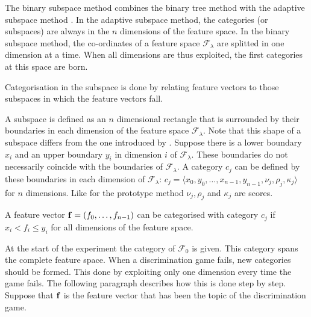 The binary subspace method combines the binary tree method with the adaptive subspace method \citep{dejongvogt:1998,dejong:2000}. In the adaptive subspace method, the categories (or subspaces) are always in the $n$ dimensions of the feature space. In the binary subspace method, the co-ordinates of a feature space ${\mathcal F}_\lambda$ are splitted in one dimension at a time. When all dimensions are thus exploited, the first categories at this space are born.

Categorisation in the subspace is done by relating feature vectors to those subspaces in which the feature vectors fall.


A subspace is defined as an $n$ dimensional rectangle that is surrounded by their boundaries in each dimension of the feature space ${\mathcal F}_\lambda$. Note that this shape of a subspace differs from the one introduced by \citet{oja:83}. Suppose there is a lower boundary $x_i$ and an upper boundary $y_i$ in dimension $i$ of ${\mathcal F}_\lambda$. These boundaries do not necessarily coincide with the boundaries of ${\mathcal F}_\lambda$. A category $c_j$ can be defined by these boundaries in each dimension of ${\mathcal F}_\lambda$: $c_j=\langle x_0,y_0,\ldots,x_{n-1},y_{n-1},\nu_j,\rho_j,\kappa_j \rangle$ for $n$ dimensions. Like for the prototype method $\nu_j,\rho_j$ and $\kappa_j$ are scores.

A feature vector ${\bf f}=(f_0,\ldots,f_{n-1})$ can be categorised with category $c_j$ if $x_i < f_i \leq y_i$ for all dimensions of the feature space.


At the start of the experiment the category of ${\mathcal F}_0$ is given. This category spans the complete feature space. When a discrimination game fails, new categories should be formed. This done by exploiting only one dimension every time the game fails. The following paragraph describes how this is done step by step. Suppose that ${\bf f}$ is the feature vector that has been the topic of the discrimination game.

